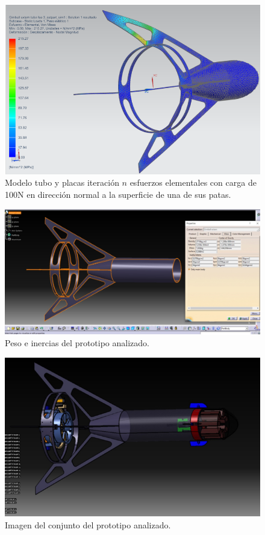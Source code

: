 \begin{figure}[htb]
    \centering
    \includegraphics[height=0.3\pdfpageheight]{fig/fea/patas4.png}
    \caption{Modelo tubo y placas iteración $n$ esfuerzos elementales con carga de 100N en dirección normal a la superficie de una de sus patas.}
    \label{fig:fea/patas4}
\end{figure}

\begin{figure}[htb]
    \centering
    \includegraphics[height=0.25\pdfpageheight]{fig/fea/inerciaspatas.png}
    \caption{Peso e inercias del prototipo analizado.}
    \label{fig:fea/patas5}
\end{figure}

\begin{figure}[htb]
    \centering
    \includegraphics[height=0.3\pdfpageheight]{fig/fea/imagenpatas.png}
    \caption{Imagen del conjunto del prototipo analizado.}
    \label{fig:fea/imagenpatas}
\end{figure}



